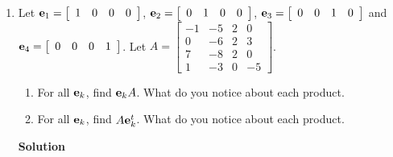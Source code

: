 \begin{enumerate}
\item Let ${\bf e}_1= \left [ \begin{array}{rrrr} 1&0&0&0
\end{array} \right ]$, ${\bf e}_2= \left [ \begin{array}{rrrr} 0&1&0&0
\end{array} \right ]$, ${\bf e}_3= \left [ \begin{array}{rrrr} 0&0&1&0
\end{array} \right ]$ and  \\ ${\bf e}_4= \left [ \begin{array}{rrrr}
0&0&0&1 \end{array} \right ]$. Let $A=\left [ \begin{array}{rrrr}
                                        -1&-5&2&0\\
                                        0&-6&2&3\\
                                        7&-8&2&0\\
                                        1&-3&0&-5 \end{array} \right]$.
\begin{enumerate}
\item For all ${\bf e}_k$, find  ${\bf e}_kA$. What do you notice about
each product.
\item For all ${\bf e}_k$, find  $A{\bf e}_k^t$. What do you notice about
each product.
\end{enumerate}

\noindent \textbf{Solution}
\end{enumerate}
